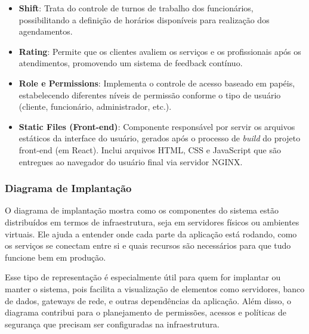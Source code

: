 \begin{itemize}
  \item \textbf{Shift}: Trata do controle de turnos de trabalho dos funcionários, possibilitando a definição de horários disponíveis para realização dos agendamentos.

  \item \textbf{Rating}: Permite que os clientes avaliem os serviços e os profissionais após os atendimentos, promovendo um sistema de feedback contínuo.
  
  \item \textbf{Role e Permissions}: Implementa o controle de acesso baseado em papéis, estabelecendo diferentes níveis de permissão conforme o tipo de usuário (cliente, funcionário, administrador, etc.).

  \item \textbf{Static Files (Front-end)}: Componente responsável por servir os arquivos estáticos da interface do usuário, gerados após o processo de \textit{build} do projeto front-end (em React). Inclui arquivos HTML, CSS e JavaScript que são entregues ao navegador do usuário final via servidor NGINX.
\end{itemize}

\subsubsection{Diagrama de Implantação}

O diagrama de implantação mostra como os componentes do sistema estão distribuídos em termos de infraestrutura, seja em servidores físicos ou ambientes virtuais. Ele ajuda a entender onde cada parte da aplicação está rodando, como os serviços se conectam entre si e quais recursos são necessários para que tudo funcione bem em produção.

Esse tipo de representação é especialmente útil para quem for implantar ou manter o sistema, pois facilita a visualização de elementos como servidores, banco de dados, gateways de rede, e outras dependências da aplicação. Além disso, o diagrama contribui para o planejamento de permissões, acessos e políticas de segurança que precisam ser configuradas na infraestrutura.

